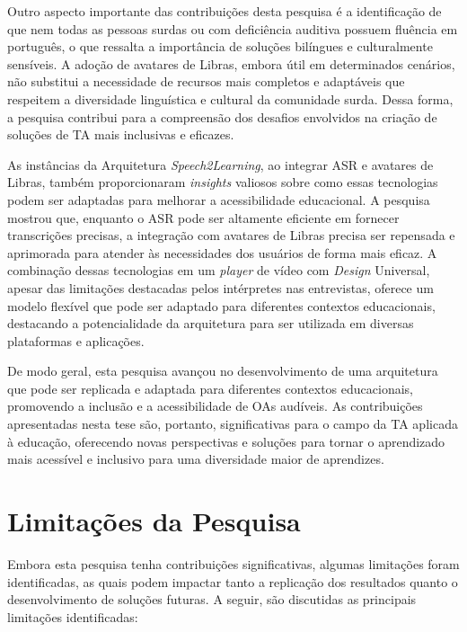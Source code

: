 Outro aspecto importante das contribuições desta pesquisa é a identificação de que nem todas as pessoas surdas ou com deficiência auditiva possuem fluência em português, o que ressalta a importância de soluções bilíngues e culturalmente sensíveis. A adoção de avatares de Libras, embora útil em determinados cenários, não substitui a necessidade de recursos mais completos e adaptáveis que respeitem a diversidade linguística e cultural da comunidade surda. Dessa forma, a pesquisa contribui para a compreensão dos desafios envolvidos na criação de soluções de TA mais inclusivas e eficazes.

As instâncias da Arquitetura \textit{Speech2Learning}, ao integrar ASR e avatares de Libras, também proporcionaram \textit{insights} valiosos sobre como essas tecnologias podem ser adaptadas para melhorar a acessibilidade educacional. A pesquisa mostrou que, enquanto o ASR pode ser altamente eficiente em fornecer transcrições precisas, a integração com avatares de Libras precisa ser repensada e aprimorada para atender às necessidades dos usuários de forma mais eficaz. A combinação dessas tecnologias em um \textit{player} de vídeo com \textit{Design} Universal, apesar das limitações destacadas pelos intérpretes nas entrevistas, oferece um modelo flexível que pode ser adaptado para diferentes contextos educacionais, destacando a potencialidade da arquitetura para ser utilizada em diversas plataformas e aplicações.

De modo geral, esta pesquisa avançou no desenvolvimento de uma arquitetura que pode ser replicada e adaptada para diferentes contextos educacionais, promovendo a inclusão e a acessibilidade de OAs audíveis. As contribuições apresentadas nesta tese são, portanto, significativas para o campo da TA aplicada à educação, oferecendo novas perspectivas e soluções para tornar o aprendizado mais acessível e inclusivo para uma diversidade maior de aprendizes.

\section{Limitações da Pesquisa}

Embora esta pesquisa tenha contribuições significativas, algumas limitações foram identificadas, as quais podem impactar tanto a replicação dos resultados quanto o desenvolvimento de soluções futuras. A seguir, são discutidas as principais limitações identificadas:

